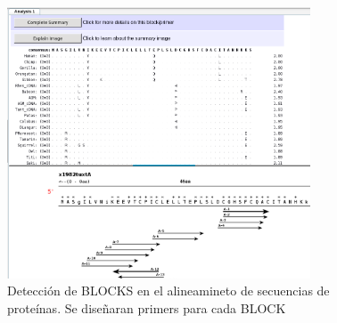 \documentclass[letter,11pt]{book}
\begin{document}
\begin{figure}[h!]
\centering
 \includegraphics[width=9cm]{Figs/CODEHOP_resultados.png}
 \caption{\label{fig:CODEHOP_resultados}Detección de BLOCKS en el alineamineto de secuencias de proteínas. Se diseñaran primers para cada BLOCK}
\end{figure}



\begin{appendices}

\label{unixguide}


\label{embossguide}


\label{blastguide}

\end{appendices} 
\end{document}
